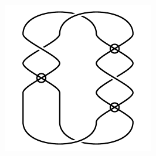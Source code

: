 \begin{figure}[H]
\begin{minipage}[b]{.18\linewidth}
\end{minipage}
\begin{minipage}[b]{.18\linewidth}
\centering
\includegraphics[width=\linewidth]{../data/virtual_4_91.png}
\end{minipage}
\end{figure}

